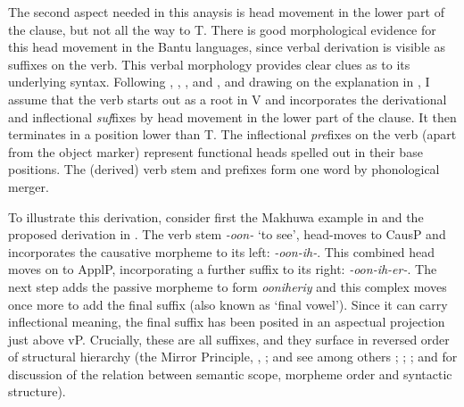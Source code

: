 \documentclass[output=paper
,modfonts
,nonflat]{langsci/langscibook}
\begin{document}
\begin{exe}
\ex {} 
	\xlist
	\endxlist
\end{exe} 

The second aspect needed in this anaysis is head movement in the lower part of the clause, but not all the way to T. There is good morphological evidence for this head movement in the Bantu languages, since verbal derivation is visible as suffixes on the verb. This verbal morphology provides clear clues as to its underlying syntax. Following \citet{Myers1990}, \citet{Julien2002}, \citet{Kinyalolo2003}, and \citet{Buell2005}, and drawing on the explanation in \citet{Van_der_Wal, 2009}, I assume that the verb starts out as a root in V and incorporates the derivational and inflectional \textit{suf}fixes by head movement in the lower part of the clause. It then terminates in a position lower than T. The inflectional \textit{pre}fixes on the verb (apart from the object marker) represent functional heads spelled out in their base positions. The (derived) verb stem and prefixes form one word by phonological merger.

To illustrate this derivation, consider first the Makhuwa example in  and the proposed derivation in . The verb stem \textit{-oon-} ‘to see’, head-moves to CausP and incorporates the causative morpheme to its left: \textit{-oon-ih-}. This combined head moves on to ApplP, incorporating a further suffix to its right: \textit{-oon-ih-er-}. The next step adds the passive morpheme to form \textit{ooniheriy} and this complex moves once more to add the final suffix (also known as ‘final vowel’). Since it can carry inflectional meaning, the final suffix has been posited in an aspectual projection just above vP. Crucially, these are all suffixes, and they surface in reversed order of structural hierarchy (the Mirror Principle, \citealt{Baker1985}, \citealt{Baker1988}; and see among others \citealt{Alsina1999}; \citealt{Hyman2003}; \citealt{Good2005}; and \citealt{Muriungi2008} for discussion of the relation between semantic scope, morpheme order and syntactic structure).
\end{document}
